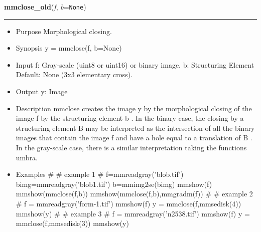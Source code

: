     \label{multireg:num_pymorph:mmclose_old}
    \vspace{0.5ex}

    \begin{boxedminipage}{\textwidth}

    \raggedright \textbf{mmclose\_old}(\textit{f}, \textit{b}=\texttt{N\-o\-n\-e\-})

    \vspace{-1.5ex}

    \rule{\textwidth}{0.5\fboxrule}
    \begin{itemize}
    \setlength{\parskip}{0.6ex}
      \item Purpose Morphological closing.

      \item Synopsis y = mmclose(f, b=None)

      \item Input f: Gray-scale (uint8 or uint16) or binary image. b: 
        Structuring Element Default: None (3x3 elementary cross).

      \item Output y: Image

      \item Description mmclose creates the image y by the morphological 
        closing of the image f by the structuring element b . In the 
        binary case, the closing by a structuring element B may be 
        interpreted as the intersection of all the binary images that 
        contain the image f and have a hole equal to a translation of B . 
        In the gray-scale case, there is a similar interpretation taking 
        the functions umbra.

      \item Examples \# \# example 1 \# f=mmreadgray('blob.tif') 
        bimg=mmreadgray('blob1.tif') b=mmimg2se(bimg) mmshow(f) 
        mmshow(mmclose(f,b)) mmshow(mmclose(f,b),mmgradm(f)) \# \# 
        example 2 \# f = mmreadgray('form-1.tif') mmshow(f) y = 
        mmclose(f,mmsedisk(4)) mmshow(y) \# \# example 3 \# f = 
        mmreadgray('n2538.tif') mmshow(f) y = mmclose(f,mmsedisk(3)) 
        mmshow(y)

    \end{itemize}

    \vspace{1ex}

    \end{boxedminipage}

